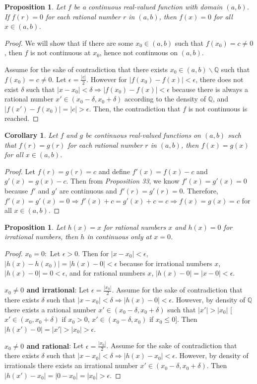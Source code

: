 \documentclass{article}
\newtheorem{proposition}[thm]{Proposition}
\newtheorem{corollary}[thm]{Corollary}
\begin{document}
\begin{proposition}
    Let $f$ be a continuous real-valued function with domain $(a,b)$. If $f(r)=0$ for each rational 
    number $r$ in $(a,b)$, then $f(x)=0$ for all $x\in(a,b)$.
\end{proposition}
\begin{proof}
    We will show that if there are some $x_0\in(a,b)$ such that 
    $f(x_0)=c\neq0$, then $f$ is not continuous at $x_0$, hence not continuous on $(a,b)$.

    Assume for the sake of contradiction that there exists $x_0\in(a,b)\backslash\mathbb{Q}$ such 
    that $f(x_0)=c\neq0$. Let $\epsilon = \frac{|c|}{2}$. However for $|f(x_0)-f(x)|<\epsilon$, there 
    does not exist $\delta$ such that $|x-x_0|<\delta\Rightarrow|f(x_0)-f(x)|<\epsilon$ because 
    there is always a rational number $x'\in (x_0-\delta, x_0+\delta)$ according to the density of 
    $\mathbb{Q}$, and $|f(x')-f(x_0)|=|c|>\epsilon$. Then, the contradiction that $f$ is not 
    continuous is reached.
\end{proof}

\begin{corollary}
    Let $f$ and $g$ be continuous real-valued functions on $(a,b)$ such that $f(r)=g(r)$ for each 
    rational number $r$ in $(a,b)$, then $f(x)=g(x)$ for all $x\in(a,b)$.
\end{corollary}
\begin{proof}
    Let $f(r)=g(r)=c$ and define $f'(x)=f(x)-c$ and $g'(x)=g(x)-c$. Then from \emph{Proposition 33},
    we know $f'(x)=g'(x)=0$ because $f'$ and $g'$ are continuous and $f'(r)=g'(r)=0$. Therefore, 
    $f'(x)=g'(x)=0\Rightarrow f'(x)+c=g'(x)+c=c\Rightarrow f(x)=g(x)=c$ for all $x\in(a,b)$.
\end{proof}

\begin{proposition}
    Let $h(x)=x$ for rational numbers $x$ and $h(x)=0$ for irrational numbers, then $h$ in 
    continuous only at $x=0$.
\end{proposition}
\begin{proof}
    $x_0=0:$ Let $\epsilon>0$. Then for $|x-x_0|<\epsilon$, $|h(x)-h(x_0)|=|h(x)-0|<\epsilon$ because for 
    irrational numbers $x$, $|h(x)-0| = 0<\epsilon$, and for rational numbers $x$, $|h(x)-0|=
    |x-0|<\epsilon$.

    \textbf{$x_0\neq 0$ and irrational}: Let $\epsilon = \frac{|x_0|}{2}$. Assume for the sake of contradiction 
    that there exists $\delta$ such that $|x-x_0|<\delta\Rightarrow|h(x)-0|<\epsilon$. However, 
    by density of $\mathbb{Q}$ there exists a rational number $x'\in (x_0-\delta, x_0+\delta)$ 
    such that $|x'|>|x_0|$ [$x'\in(x_0,x_0+\delta)$ if $x_0>0$, $x'\in(x_0-\delta,x_0)$ if 
    $x_0\le 0$]. Then $|h(x')-0|=|x'|>|x_0|>\epsilon$.

    \textbf{$x_0\neq0$ and rational}: Let $\epsilon = \frac{|x_0|}{2}$. Assume for the sake of contradiction 
    that there exists $\delta$ such that $|x-x_0|<\delta\Rightarrow|h(x)-x_0|<\epsilon$. However, 
    by density of irrationals there exists an irrational number $x'\in (x_0-\delta, x_0+\delta)$. 
    Then $|h(x')-x_0|=|0-x_0|=|x_0|>\epsilon$.
\end{proof}
\end{document}
